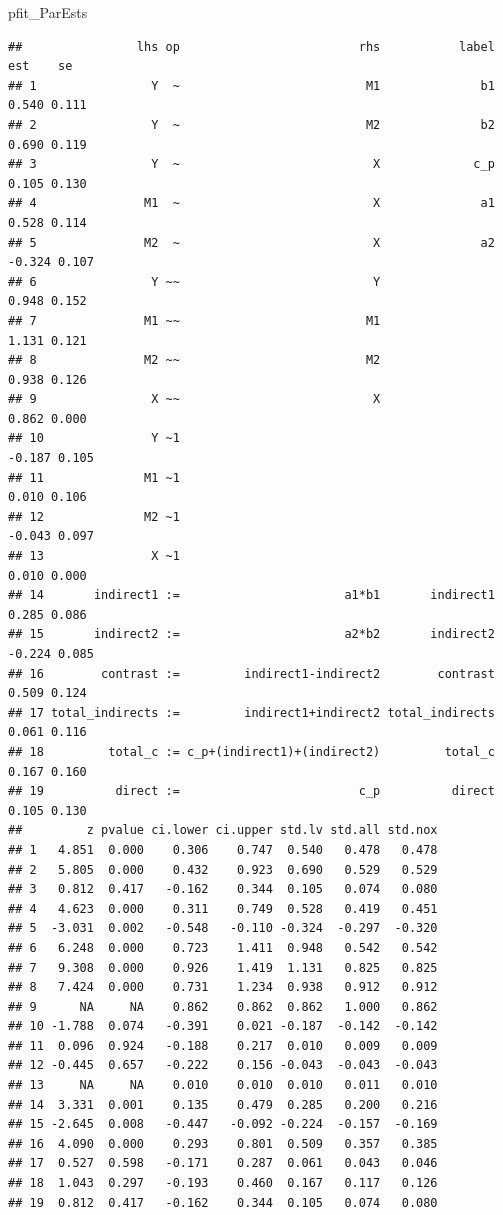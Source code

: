 \documentclass[
  11pt,
]{book}
\newenvironment{Shaded}{\begin{snugshade}}{\end{snugshade}}
\newcommand{\NormalTok}[1]{#1}
\begin{document}
\begin{Shaded}
\begin{Highlighting}[]
\NormalTok{pfit\_ParEsts}
\end{Highlighting}
\end{Shaded}

\begin{verbatim}
##                lhs op                         rhs           label    est    se
## 1                Y  ~                          M1              b1  0.540 0.111
## 2                Y  ~                          M2              b2  0.690 0.119
## 3                Y  ~                           X             c_p  0.105 0.130
## 4               M1  ~                           X              a1  0.528 0.114
## 5               M2  ~                           X              a2 -0.324 0.107
## 6                Y ~~                           Y                  0.948 0.152
## 7               M1 ~~                          M1                  1.131 0.121
## 8               M2 ~~                          M2                  0.938 0.126
## 9                X ~~                           X                  0.862 0.000
## 10               Y ~1                                             -0.187 0.105
## 11              M1 ~1                                              0.010 0.106
## 12              M2 ~1                                             -0.043 0.097
## 13               X ~1                                              0.010 0.000
## 14       indirect1 :=                       a1*b1       indirect1  0.285 0.086
## 15       indirect2 :=                       a2*b2       indirect2 -0.224 0.085
## 16        contrast :=         indirect1-indirect2        contrast  0.509 0.124
## 17 total_indirects :=         indirect1+indirect2 total_indirects  0.061 0.116
## 18         total_c := c_p+(indirect1)+(indirect2)         total_c  0.167 0.160
## 19          direct :=                         c_p          direct  0.105 0.130
##         z pvalue ci.lower ci.upper std.lv std.all std.nox
## 1   4.851  0.000    0.306    0.747  0.540   0.478   0.478
## 2   5.805  0.000    0.432    0.923  0.690   0.529   0.529
## 3   0.812  0.417   -0.162    0.344  0.105   0.074   0.080
## 4   4.623  0.000    0.311    0.749  0.528   0.419   0.451
## 5  -3.031  0.002   -0.548   -0.110 -0.324  -0.297  -0.320
## 6   6.248  0.000    0.723    1.411  0.948   0.542   0.542
## 7   9.308  0.000    0.926    1.419  1.131   0.825   0.825
## 8   7.424  0.000    0.731    1.234  0.938   0.912   0.912
## 9      NA     NA    0.862    0.862  0.862   1.000   0.862
## 10 -1.788  0.074   -0.391    0.021 -0.187  -0.142  -0.142
## 11  0.096  0.924   -0.188    0.217  0.010   0.009   0.009
## 12 -0.445  0.657   -0.222    0.156 -0.043  -0.043  -0.043
## 13     NA     NA    0.010    0.010  0.010   0.011   0.010
## 14  3.331  0.001    0.135    0.479  0.285   0.200   0.216
## 15 -2.645  0.008   -0.447   -0.092 -0.224  -0.157  -0.169
## 16  4.090  0.000    0.293    0.801  0.509   0.357   0.385
## 17  0.527  0.598   -0.171    0.287  0.061   0.043   0.046
## 18  1.043  0.297   -0.193    0.460  0.167   0.117   0.126
## 19  0.812  0.417   -0.162    0.344  0.105   0.074   0.080
\end{verbatim}
\end{document}
